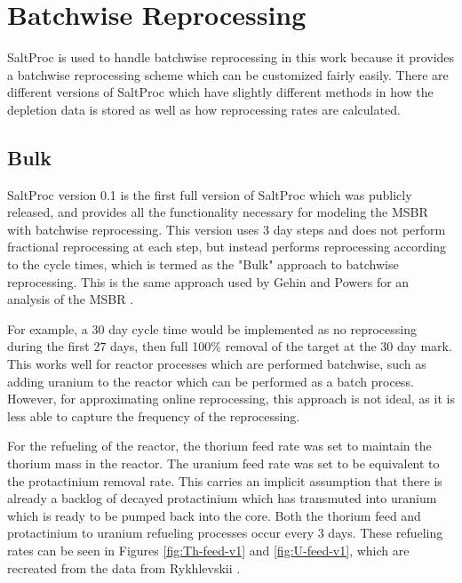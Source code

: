 \renewcommand*\descriptionlabel[1]{\hspace\leftmargin$#1$}
\setcounter{tocdepth}{5}
\setcounter{secnumdepth}{5}




\section{Batchwise Reprocessing}

SaltProc is used to handle batchwise reprocessing in this work because it provides a batchwise reprocessing scheme which can be customized fairly easily. There are different versions of SaltProc which have slightly different methods in how the depletion data is stored as well as how reprocessing rates are calculated.

\subsection{Bulk}

SaltProc version 0.1 is the first full version of SaltProc which was publicly released, and provides all the functionality necessary for modeling the MSBR with batchwise reprocessing. This version uses 3 day steps and does not perform fractional reprocessing at each step, but instead performs reprocessing according to the cycle times, which is termed as the "Bulk" approach to batchwise reprocessing. This is the same approach used by Gehin and Powers for an analysis of the MSBR \cite{gehin_liquid_2016}.

For example, a 30 day cycle time would be implemented as no reprocessing during the first 27 days, then full 100\% removal of the target at the 30 day mark. This works well for reactor processes which are performed batchwise, such as adding uranium to the reactor which can be performed as a batch process. However, for approximating online reprocessing, this approach is not ideal, as it is less able to capture the frequency of the reprocessing.

For the refueling of the reactor, the thorium feed rate was set to maintain the thorium mass in the reactor. The uranium feed rate was set to be equivalent to the protactinium removal rate. This carries an implicit assumption that there is already a backlog of decayed protactinium which has transmuted into uranium which is ready to be pumped back into the core. Both the thorium feed and protactinium to uranium refueling processes occur every 3 days. These refueling rates can be seen in Figures \ref{fig:Th-feed-v1} and \ref{fig:U-feed-v1}, which are recreated from the data from Rykhlevskii \cite{rykhlevskii_advanced_2018}.

